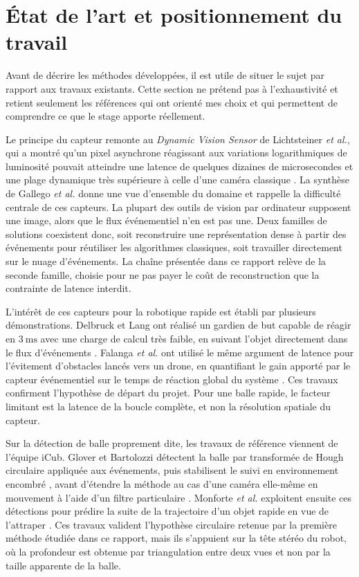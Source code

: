 \documentclass[a4paper,11pt]{report}
\begin{document}
\section{État de l'art et positionnement du travail}
\label{sec:etat-art}

Avant de décrire les méthodes développées, il est utile de situer le sujet par rapport aux travaux existants. Cette section ne prétend pas à l'exhaustivité et retient seulement les références qui ont orienté mes choix et qui permettent de comprendre ce que le stage apporte réellement.

Le principe du capteur remonte au \emph{Dynamic Vision Sensor} de Lichtsteiner \emph{et al.}, qui a montré qu'un pixel asynchrone réagissant aux variations logarithmiques de luminosité pouvait atteindre une latence de quelques dizaines de microsecondes et une plage dynamique très supérieure à celle d'une caméra classique \cite{lichtsteiner-dvs}. La synthèse de Gallego \emph{et al.} \cite{gallego-survey} donne une vue d'ensemble du domaine et rappelle la difficulté centrale de ces capteurs. La plupart des outils de vision par ordinateur supposent une image, alors que le flux événementiel n'en est pas une. Deux familles de solutions coexistent donc, soit reconstruire une représentation dense à partir des événements pour réutiliser les algorithmes classiques, soit travailler directement sur le nuage d'événements. La chaîne présentée dans ce rapport relève de la seconde famille, choisie pour ne pas payer le coût de reconstruction que la contrainte de latence interdit.

L'intérêt de ces capteurs pour la robotique rapide est établi par plusieurs démonstrations. Delbruck et Lang ont réalisé un gardien de but capable de réagir en \(3~\text{ms}\) avec une charge de calcul très faible, en suivant l'objet directement dans le flux d'événements \cite{delbruck-goalie}. Falanga \emph{et al.} ont utilisé le même argument de latence pour l'évitement d'obstacles lancés vers un drone, en quantifiant le gain apporté par le capteur événementiel sur le temps de réaction global du système \cite{falanga-avoidance}. Ces travaux confirment l'hypothèse de départ du projet. Pour une balle rapide, le facteur limitant est la latence de la boucle complète, et non la résolution spatiale du capteur.

Sur la détection de balle proprement dite, les travaux de référence viennent de l'équipe iCub. Glover et Bartolozzi détectent la balle par transformée de Hough circulaire appliquée aux événements, puis stabilisent le suivi en environnement encombré \cite{glover-ball}, avant d'étendre la méthode au cas d'une caméra elle-même en mouvement à l'aide d'un filtre particulaire \cite{glover-tracking}. Monforte \emph{et al.} exploitent ensuite ces détections pour prédire la suite de la trajectoire d'un objet rapide en vue de l'attraper \cite{monforte-prediction}. Ces travaux valident l'hypothèse circulaire retenue par la première méthode étudiée dans ce rapport, mais ils s'appuient sur la tête stéréo du robot, où la profondeur est obtenue par triangulation entre deux vues et non par la taille apparente de la balle.
\end{document}
